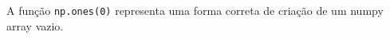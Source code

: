 \documentclass[12pt,varwidth=16cm,border=1pt]{standalone}
\begin{document}
A função \verb+np.ones(0)+ representa uma forma correta de criação de um numpy array vazio.

\questiomtrue
\end{document}
